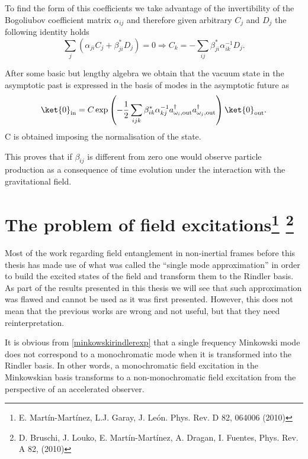 To find the form of this coefficients we take advantage of the invertibility of the Bogoliubov coefficient matrix $\alpha_{ij}$ and therefore given arbitrary $C_j$ and $D_j$ the following identity holds
\begin{equation}\label{inve}
\sum_j\left(\alpha_{j i}C_j+\beta_{ji}^*D_j\right)=0\Rightarrow C_k=-\sum_{ij}\beta^*_{ji}\alpha_{ ik}^{-1}D_j.
\end{equation}

After some basic but lengthy algebra we obtain that the vacuum state in the asymptotic past is expressed in the basis of modes in the asymptotic future as
\begin{equation}\label{dynoresult}
\ket{0}_\text{in}=C\exp\left(-\frac12\sum_{ijk}\beta^*_{ik}\alpha_{ kj}^{-1}a_{\omega_{i},\text{out}}^\dagger a_{\omega_{j},\text{out}}^\dagger\right)\ket{0}_\text{out}.
\end{equation}
C is obtained imposing the normalisation of the state.

This proves that if $\beta_{ij}$ is different from zero one would observe particle production as a consequence of time evolution under the interaction with the gravitational field. 

\section{The problem of field excitations\footnote{E. Mart\'in-Mart\'inez, L.J. Garay, J. Le\'on. Phys. Rev. D 82, 064006 (2010)} \footnote{D. \!
Bruschi,\! J. Louko,\! E. Mart\'in-Mart\'inez,\! A. Dragan,\! I. Fuentes,\! Phys.\! Rev.\! A 82, (2010)}}\label{probexcitations}

Most of the work regarding field entanglement in non-inertial frames before this thesis has made use of what was called the ``single mode approximation'' \cite{Alsingtelep,AlsingMcmhMil} in order to build the excited states of the field and transform them to the Rindler basis. As part of the results presented in this thesis we will see that such approximation was flawed and cannot be used as it was first presented. However, this does not mean that the previous works are wrong and not useful, but that they need reinterpretation.


It is obvious from \eqref{minkowskirindlerexp} that a single frequency Minkowski mode does not correspond to a monochromatic mode when it is transformed into the Rindler basis. In other words, a monochromatic field excitation in the Minkowskian basis transforms to a non-monochromatic field excitation from the perspective of an accelerated observer.

